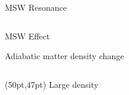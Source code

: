 \begin{frame}{MSW Resonance}
\begin{columns}[T]
\begin{column}{0.5\textwidth}
\begin{itemize}
\end{itemize}









\end{column}
\end{columns}







\end{frame}


\begin{frame}{MSW Effect}



\centering

\vspace{-1em}
Adiabatic matter density change

\begin{columns}[T]
\begin{column}{0.33\textwidth}

\begin{textblock*}{70pt}(50pt,47pt)
\small
Large density
\end{textblock*}




\end{column}
\end{columns}
\end{frame}

